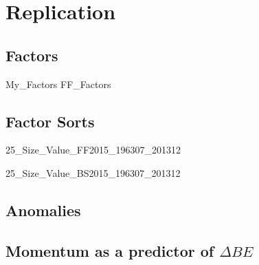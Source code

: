 
\section{Replication} \label{sec:repl}

\subsection{\textcite{fama2016dissecting, fama2016choosing} Factors} \label{sec:repl.FF2016}

{My_Factors}
{FF_Factors}

\subsection{\textcite{fama2015five} Factor Sorts}

{25_Size_Value_FF2015_196307_201312}

{25_Size_Value_BS2015_196307_201312}

\subsection{\textcite{fama2016dissecting, fama2016choosing} Anomalies}

\subsection{\textcite{asness2013devil} Momentum as a predictor of $\Delta BE$}
